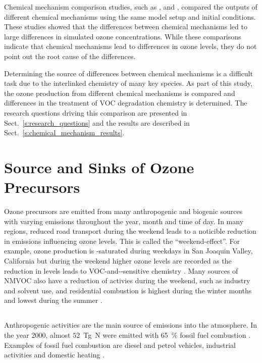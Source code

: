 Chemical mechanism comparison studies, such as \citet{Kuhn:1998}, \citet{Emmerson:2009} and \citet{Archibald:2010}, compared the outputs of different chemical mechanisms using the same model setup and initial conditions.
These studies showed that the differences between chemical mechanisms led to large differences in simulated ozone concentrations.
While these comparisons indicate that chemical mechanisms lead to differences in ozone levels, they do not point out the root cause of the differences.

Determining the source of differences between chemical mechanisms is a difficult task due to the interlinked chemistry of many key species.
As part of this study, the ozone production from different chemical mechanisms is compared and differences in the treatment of VOC degradation chemistry is determined.
The research questions driving this comparison are presented in Sect.~\ref{s:research_questions} and the results are described in Sect.~\ref{s:chemical_mechanism_results}.

\section{Source and Sinks of Ozone Precursors} \label{s:precursor_emissions}
Ozone precursors are emitted from many anthropogenic and biogenic sources with varying emissions throughout the year, month and time of day.
In many regions, reduced road transport during the weekend leads to a noticible reduction in  emissions influencing ozone levels.
This is called the ``weekend-effect''.
For example, ozone production is -saturated during weekdays in San Joaquin Valley, California but during the weekend higher ozone levels are recorded as the reduction in  levels leads to VOC-and--sensitive chemistry \citep{Pusede:2014}.
Many sources of NMVOC also have a reduction of activies during the weekend, such as industry and solvent use, and residential combustion is highest during the winter months and lowest during the summer \citep{Gon:2011}.

\subsection[NOx]{}
Anthropogenic activities are the main source of  emissions into the atmosphere.
In the year 2000, almost $52$~Tg~N were emitted with 65~\% fossil fuel combustion \citep{Seinfeld:2006}. 
Examples of fossil fuel combustion are diesel and petrol vehicles, industrial activities and domestic heating \citep{vonSchneidemesser:2015}.

